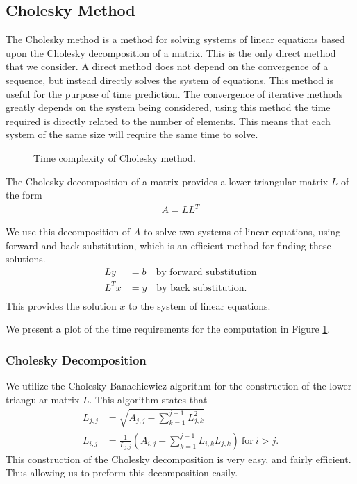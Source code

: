 \documentclass[../fem.tex]{subfile}
\begin{document}
\subsection{Cholesky Method}%
\label{sub:cholesky_method}

The Cholesky method is a method for solving systems of linear equations based
upon the Cholesky decomposition of a matrix. This is the only direct method
that we consider. A direct method does not depend on the convergence of a sequence,
but instead directly solves the system of equations. This method is useful for
the purpose of time prediction. The convergence of iterative methods greatly
depends on the system being considered, using this method the time required is
directly related to the number of elements. This means that each system of the
same size will require the same time to solve.

\begin{figure}[htpb]
  \centering
     
  \caption{Time complexity of Cholesky method.}
  \label{fig:ch_time}
\end{figure}

The Cholesky decomposition of a matrix provides a lower triangular matrix $L$
of the form
\begin{align*}
  A=LL^T
\end{align*}

We use this decomposition of $A$ to solve two systems of linear equations,
using forward and back substitution, which is an efficient method for finding
these solutions.
\begin{align*}
  Ly&=b\quad\text{by forward substitution}\\
  L^Tx&=y\quad\text{by back substitution}.\\
\end{align*}
This provides the solution $x$ to the system of linear equations.

We present a plot of the time requirements for the computation in
Figure \ref{fig:ch_time}.

\subsubsection{Cholesky Decomposition}%
\label{ssub:cholesky_decomposition}


We utilize the Cholesky-Banachiewicz algorithm for the construction of the
lower triangular matrix $L$. This algorithm states that
\begin{align*}
  L_{j,j}&=\sqrt{A_{j,j}-\sum_{k=1}^{j-1}L_{j,k}^2}\\
  L_{i,j}&=\frac{1}{L_{j,j}}\left(A_{i,j}-\sum_{k=1}^{j-1}L_{i,k}L_{j,k}\right)\
  \text{for}\ i>j.
\end{align*}
This construction of the Cholesky decomposition is very easy, and fairly
efficient. Thus allowing us to preform this decomposition easily.
\end{document}
